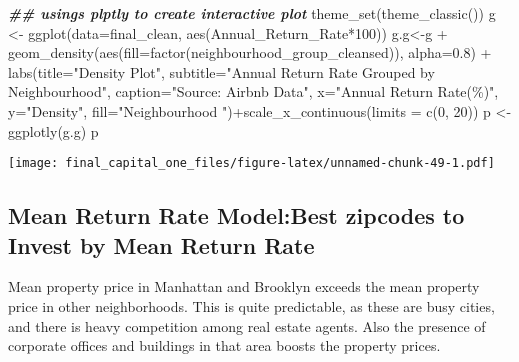 \documentclass[
]{article}
\newenvironment{Shaded}{\begin{snugshade}}{\end{snugshade}}
\newcommand{\AttributeTok}[1]{\textcolor[rgb]{0.77,0.63,0.00}{#1}}
\newcommand{\DecValTok}[1]{\textcolor[rgb]{0.00,0.00,0.81}{#1}}
\newcommand{\DocumentationTok}[1]{\textcolor[rgb]{0.56,0.35,0.01}{\textbf{\textit{#1}}}}
\newcommand{\FloatTok}[1]{\textcolor[rgb]{0.00,0.00,0.81}{#1}}
\newcommand{\FunctionTok}[1]{\textcolor[rgb]{0.00,0.00,0.00}{#1}}
\newcommand{\NormalTok}[1]{#1}
\newcommand{\OtherTok}[1]{\textcolor[rgb]{0.56,0.35,0.01}{#1}}
\newcommand{\SpecialCharTok}[1]{\textcolor[rgb]{0.00,0.00,0.00}{#1}}
\newcommand{\StringTok}[1]{\textcolor[rgb]{0.31,0.60,0.02}{#1}}
\begin{document}
\begin{Shaded}
\begin{Highlighting}[]
\DocumentationTok{\#\# usings plptly to create interactive plot }
\FunctionTok{theme\_set}\NormalTok{(}\FunctionTok{theme\_classic}\NormalTok{())}
\NormalTok{g }\OtherTok{\textless{}{-}} \FunctionTok{ggplot}\NormalTok{(}\AttributeTok{data=}\NormalTok{final\_clean, }\FunctionTok{aes}\NormalTok{(Annual\_Return\_Rate}\SpecialCharTok{*}\DecValTok{100}\NormalTok{))}
\NormalTok{g.g}\OtherTok{\textless{}{-}}\NormalTok{g }\SpecialCharTok{+} \FunctionTok{geom\_density}\NormalTok{(}\FunctionTok{aes}\NormalTok{(}\AttributeTok{fill=}\FunctionTok{factor}\NormalTok{(neighbourhood\_group\_cleansed)), }\AttributeTok{alpha=}\FloatTok{0.8}\NormalTok{) }\SpecialCharTok{+} 
  \FunctionTok{labs}\NormalTok{(}\AttributeTok{title=}\StringTok{"Density Plot"}\NormalTok{, }
       \AttributeTok{subtitle=}\StringTok{"Annual Return Rate Grouped by Neighbourhood"}\NormalTok{,}
       \AttributeTok{caption=}\StringTok{"Source: Airbnb Data"}\NormalTok{,}
       \AttributeTok{x=}\StringTok{"Annual Return Rate(\%)"}\NormalTok{,}
       \AttributeTok{y=}\StringTok{"Density"}\NormalTok{,}
       \AttributeTok{fill=}\StringTok{"Neighbourhood "}\NormalTok{)}\SpecialCharTok{+}\FunctionTok{scale\_x\_continuous}\NormalTok{(}\AttributeTok{limits =} \FunctionTok{c}\NormalTok{(}\DecValTok{0}\NormalTok{, }\DecValTok{20}\NormalTok{))}
\NormalTok{p }\OtherTok{\textless{}{-}} \FunctionTok{ggplotly}\NormalTok{(g.g)}
\NormalTok{p}
\end{Highlighting}
\end{Shaded}

\texttt{[image: final\_capital\_one\_files/figure-latex/unnamed-chunk-49-1.pdf]}

\hypertarget{mean-return-rate-modelbest-zipcodes-to-invest-by-mean-return-rate}{%
\subsection{Mean Return Rate Model:Best zipcodes to Invest by Mean
Return
Rate}\label{mean-return-rate-modelbest-zipcodes-to-invest-by-mean-return-rate}}

Mean property price in Manhattan and Brooklyn exceeds the mean property
price in other neighborhoods. This is quite predictable, as these are
busy cities, and there is heavy competition among real estate agents.
Also the presence of corporate offices and buildings in that area boosts
the property prices.
\end{document}
